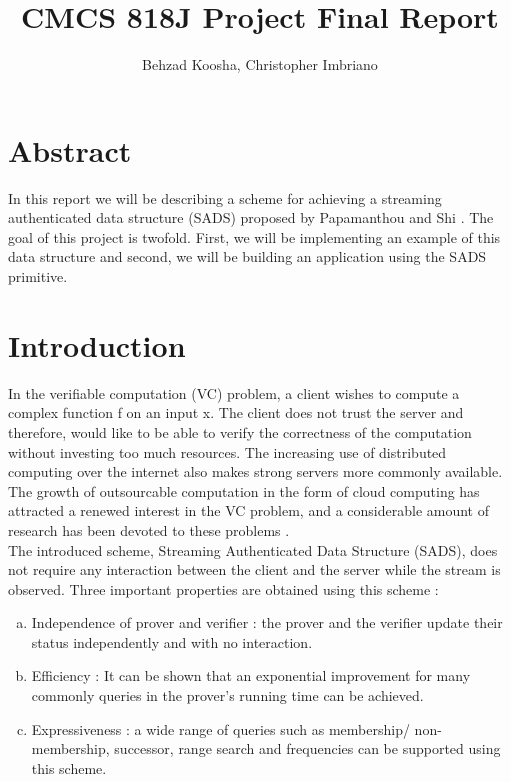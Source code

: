 \documentclass[11pt, letterpaper, oneside]{article}
\begin{document}
\title{\textbf{CMCS 818J Project Final Report}}
\author{Behzad Koosha, Christopher Imbriano}

\maketitle

\section{Abstract}

	In this report we will be describing a scheme for achieving a streaming authenticated data structure (SADS) proposed by Papamanthou and 
	Shi \cite{sads}. The goal of this project is twofold. First, we will be implementing an example of this data
	structure and second, we will be building an application using the SADS primitive. 


\section{Introduction}

	In the verifiable computation (VC) problem, a client wishes to compute a complex
	function f on an input x. The client does not trust the server and therefore, would like to
	be able to verify the correctness of the computation without investing too much resources.
	The increasing use of distributed computing over the internet also makes strong servers more commonly 
	available. The growth of outsourcable computation in the form of cloud computing has attracted a renewed
	interest in the VC problem, and a considerable amount of research has been devoted to these problems \cite{evsc}.\\ 
	
	The introduced scheme, Streaming Authenticated Data Structure (SADS), does not require any interaction between the client and the server while the stream is observed.
	Three important properties are obtained using this scheme :
	\begin{enumerate}[a.]
	\item Independence of prover and verifier : the prover and the verifier update their status independently and with no interaction.
	\item Efficiency : It can be shown that an exponential improvement for many commonly queries in the prover's running time can be achieved.
	\item Expressiveness : a wide range of queries such as membership/ non-membership, successor, range search and frequencies can be supported using this scheme.
	\end{enumerate} 
	
\end{document}

